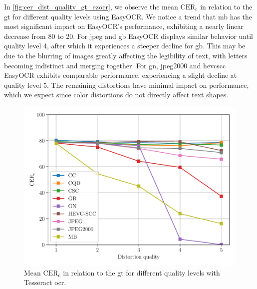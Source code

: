In \autoref{fig:cer_dist_quality_gt_ezocr}, we observe the mean $\text{CER}_{\text{c}}$ in relation to the \gls{gt} for different quality levels using EasyOCR.
We notice a trend that \gls{mb} has the most significant impact on EasyOCR's performance, exhibiting a nearly linear decrease from 80 to 20.
For \gls{jpeg} and \gls{gb} EasyOCR displays similar behavior until quality level 4, after which it experiences a steeper decline for \gls{gb}.
This may be due to the blurring of images greatly affecting the legibility of text, with letters becoming indistinct and merging together.
For \gls{gn}, \gls{jpeg2000} and \gls{hevcscc} EasyOCR exhibits comparable performance, experiencing a slight decline at quality level 5.
The remaining distortions have minimal impact on performance, which we expect since color distortions do not directly affect text shapes.

\begin{figure}[h!]
\centering
    \includegraphics[width=\textwidth]{../../images/analyze/cer_dist_quality_gt_tess.pdf}
    \caption{Mean $\text{CER}_{\text{c}}$ in relation to the \gls{gt} for different quality levels with Tesseract \gls{ocr}.}
\label{fig:cer_dist_quality_gt_tesseract}
\end{figure}

